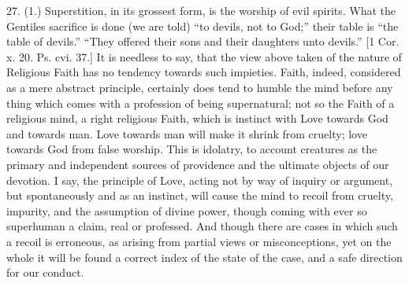 27. (1.) Superstition, in its grossest form, is the worship of evil
spirits. What the Gentiles sacrifice is done (we are told) ``to
devils, not to God;'' their table is ``the table of
devils.'' ``They offered their sons and their daughters unto
devils.'' [1 Cor. x. 20. Ps. cvi. 37.] It is needless to say, that
the view above taken of the nature of Religious Faith has no tendency
towards such impieties. Faith, indeed, considered as a mere abstract
principle, certainly does tend to humble the mind before any thing
which comes with a profession of being supernatural; not so the Faith
of a religious mind, a right religious Faith, which is instinct with
Love towards God and towards man. Love towards man will make it shrink
from cruelty; love towards God from false worship. This is idolatry,
to account creatures as the primary and independent sources of
providence and the ultimate objects of our devotion. I say, the
principle of Love, acting not by way of inquiry or argument, but
spontaneously and as an instinct, will cause the mind to recoil from
cruelty, impurity, and the assumption of divine power, though coming
with ever so superhuman a claim, real or professed. And though there
are cases in which such a recoil is erroneous, as arising from partial
views or misconceptions, yet on the whole it will be found a correct
index of the state of the case, and a safe direction for our conduct.

